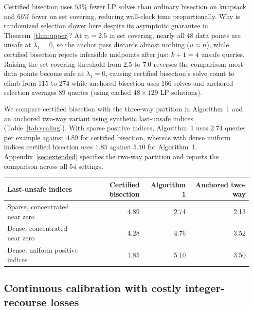\documentclass[a4paper,10pt]{article}
\theoremstyle{plain}
\theoremstyle{remark}
\begin{document}
Certified bisection uses $53\%$ fewer LP solves than ordinary bisection on knapsack and $66\%$ fewer on set covering, reducing wall-clock time proportionally. Why is randomized selection slower here despite its asymptotic guarantee in Theorem~\ref{thm:upper}? At $\tau_i=2.5$ in set covering, nearly all $48$ data points are unsafe at $\lambda_1=0$, so the anchor pass discards almost nothing ($u\approx n$), while certified bisection rejects infeasible midpoints after just $k+1=4$ unsafe queries. Raising the set-covering threshold from $2.5$ to $7.0$ reverses the comparison: most data points become safe at $\lambda_1=0$, causing certified bisection's solve count to climb from $115$ to $274$ while anchored bisection uses $166$ solves and anchored selection averages $89$ queries (using cached $48\times 129$ LP solutions).

We compare certified bisection with the three-way partition in Algorithm~1 and an anchored two-way variant using synthetic last-unsafe indices (Table~\ref{tab:scaling}). With sparse positive indices, Algorithm~1 uses $2.74$ queries per example against $4.89$ for certified bisection, whereas with dense uniform indices certified bisection uses $1.85$ against $5.10$ for Algorithm~1. Appendix~\ref{sec:extended} specifies the two-way partition and reports the comparison across all $54$ settings.

\begin{center}
\begin{minipage}{\linewidth}\centering\small
{}\label{tab:scaling}\smallskip
\begin{tabular}{@{}lrrr@{}}\toprule
Last-unsafe indices & Certified bisection & Algorithm 1 & Anchored two-way\\\midrule
Sparse, concentrated near zero & 4.89 & 2.74 & 2.13\\
Dense, concentrated near zero & 4.28 & 4.76 & 3.52\\
Dense, uniform positive indices & 1.85 & 5.10 & 3.50\\\bottomrule
\end{tabular}
\end{minipage}
\end{center}

\subsection{Continuous calibration with costly integer-recourse losses}\label{sec:lazy-exp}
\end{document}
